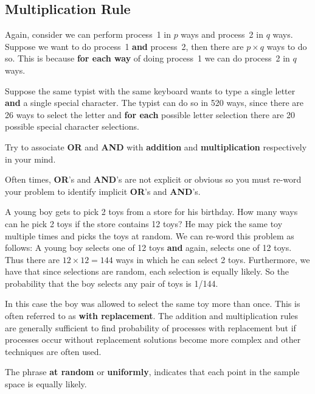 \subsection*{Multiplication Rule}
Again, consider we can perform process~1 in $p$ ways and process~2 in $q$ ways. Suppose we want to do process~1 \textbf{and} process~2, then there are $p \times q$ ways to do so. This is because \textbf{for each way} of doing process~1 we can do process~2 in $q$ ways.
\begin{example}
Suppose the same typist with the same keyboard wants to type a single letter \textbf{and} a single special character. The typist can do so in 520 ways, since there are 26 ways to select the letter and \textbf{for each} possible letter selection there are 20 possible special character selections.
\end{example}
\begin{info}
Try to associate \textbf{OR} and \textbf{AND} with \textbf{addition} and \textbf{multiplication} respectively in your mind.
\end{info}
\begin{info}
 Often times, \textbf{OR}'s and \textbf{AND}'s are not explicit or obvious so you must re-word your problem to identify implicit \textbf{OR}'s and \textbf{AND}'s.
\end{info}
\begin{example}
A young boy gets to pick 2 toys from a store for his birthday. How many ways can he pick 2 toys if the store contains 12 toys? He may pick the same toy multiple times and picks the toys at random.
\tcblower
We can re-word this problem as follows: A young boy selects one of 12 toys \textbf{and} again, selects one of 12 toys. Thus there are $12 \times 12 = 144$ ways in which he can select 2 toys. Furthermore, we have that since selections are random, each selection is equally likely. So the probability that the boy selects any pair of toys is 1/144.
\end{example}
\begin{info}
In this case the boy was allowed to select the same toy more than once. This is often referred to as \textbf{with replacement}. The addition and multiplication rules are generally sufficient to find probability of processes with replacement but if processes occur without replacement solutions become more complex and other techniques are often used.
\end{info}
\begin{info}
The phrase \textbf{at random} or \textbf{uniformly}, indicates that each point in the sample space is equally likely.
\end{info}
